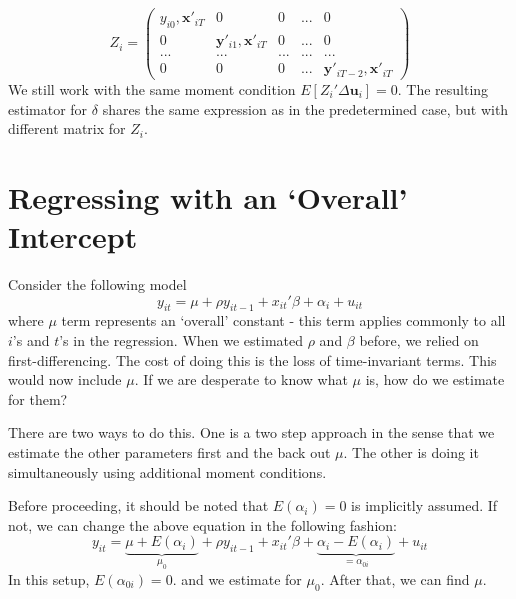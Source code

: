 \begin{itemize}
\[
Z_i = \begin{pmatrix}y_{i0}, \mathbf{x}'_{iT}& 0 &0 &...& 0\\ 0 & \mathbf{y}'_{i1},\mathbf{x}'_{iT}& 0 & ... & 0 \\ ...&...&...&...&...\\ 0 & 0& 0& ... & \mathbf{y}'_{iT-2},\mathbf{x}'_{iT}\end{pmatrix}
\]
We still work with the same moment condition $E[Z_i'\Delta \mathbf{u}_i]=0$. The resulting estimator for $\delta$ shares the same expression as in the predetermined case, but with different matrix for $Z_i$. 
\end{itemize}

\section{Regressing with an `Overall' Intercept}
Consider the following model
\[
y_{it}=\mu+\rho y_{it-1}+x_{it}'\beta+\alpha_i + u_{it}
\]
where $\mu$ term represents an `overall' constant - this term applies commonly to all $i$'s and $t$'s in the regression. When we estimated $\rho$ and $\beta$ before, we relied on first-differencing. The cost of doing this is the loss of time-invariant terms. This would now include $\mu$. If we are desperate to know what $\mu$ is, how do we estimate for them? \par
There are two ways to do this. One is a two step approach in the sense that we estimate the other parameters first and the back out $\mu$. The other is doing it simultaneously using additional moment conditions. \par
Before proceeding, it should be noted that $E(\alpha_i)=0$ is implicitly assumed. If not, we can change the above equation in the following fashion:
\[
y_{it}=\underbrace{\mu+E(\alpha_i)}_{\mu_0}+\rho y_{it-1}+x_{it}'\beta+\underbrace{\alpha_i-E(\alpha_i)}_{=\alpha_{0i}} + u_{it}
\]
In this setup, $E(\alpha_{0i})=0$. and we estimate for $\mu_0$. After that, we can find $\mu$.  \par

